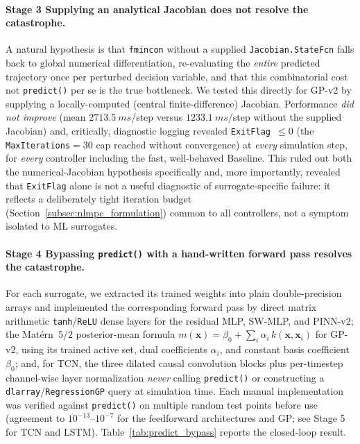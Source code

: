 \paragraph{Stage 3  Supplying an analytical Jacobian does not
resolve the catastrophe.} A natural hypothesis is that \texttt{fmincon}
without a supplied \texttt{Jacobian.StateFcn} falls back to global
numerical differentiation, re-evaluating the \emph{entire} predicted
trajectory once per perturbed decision variable, and that this
combinatorial cost  not \texttt{predict()} per se  is the true
bottleneck. We tested this directly for GP-v2 by supplying a
locally-computed (central finite-difference) Jacobian. Performance
\emph{did not improve} (mean $\SI{2713.5}{ms}$/step versus
$\SI{1233.1}{ms}$/step without the supplied Jacobian) and, critically,
diagnostic logging revealed \texttt{ExitFlag~$\le 0$} (the
\texttt{MaxIterations}$=30$ cap reached without convergence) at
\emph{every} simulation step, for \emph{every} controller including the
fast, well-behaved Baseline. This ruled out both the numerical-Jacobian
hypothesis specifically and, more importantly, revealed that
\texttt{ExitFlag} alone is not a useful diagnostic of surrogate-specific
failure: it reflects a deliberately tight iteration budget
(Section~\ref{subsec:nlmpc_formulation}) common to all controllers, not
a symptom isolated to ML surrogates.

\paragraph{Stage 4  Bypassing \texttt{predict()} with a hand-written
forward pass resolves the catastrophe.} For each surrogate, we
extracted its trained weights into plain double-precision arrays and
implemented the corresponding forward pass by direct matrix arithmetic
 \texttt{tanh}/\texttt{ReLU} dense layers for the residual MLP,
SW-MLP, and PINN-v2; the Mat\'ern~5/2 posterior-mean formula
$m(\mathbf{x}) = \beta_0 + \sum_i \alpha_i\, k(\mathbf{x},\mathbf{x}_i)$
for GP-v2, using its trained active set, dual coefficients $\alpha_i$,
and constant basis coefficient $\beta_0$; and, for TCN, the three
dilated causal convolution blocks plus per-timestep channel-wise layer
normalization  \emph{never} calling \texttt{predict()} or
constructing a \texttt{dlarray}/\texttt{RegressionGP} query at
simulation time. Each manual implementation was verified against
\texttt{predict()} on multiple random test points before use (agreement
to $10^{-13}$--$10^{-7}$ for the feedforward architectures and GP; see
Stage 5 for TCN and LSTM). Table~\ref{tab:predict_bypass} reports the
closed-loop result.

